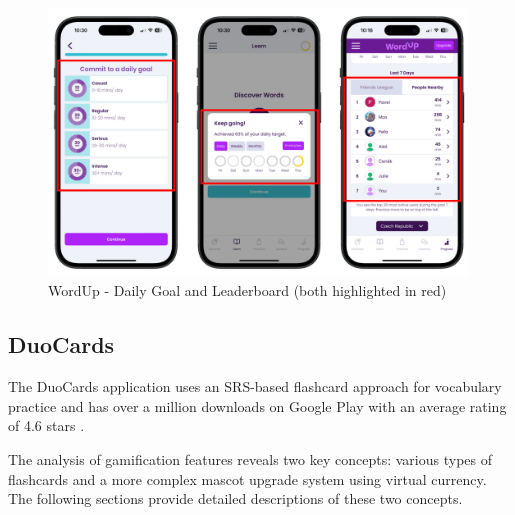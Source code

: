 \begin{itemize}
    \begin{figure}[!h]
        \includegraphics[width=0.99\textwidth]{src/figures/wordup-daily-goal.png}
        \caption{WordUp - Daily Goal and Leaderboard (both highlighted in red)}
        \label{fig:wordup-daily-goal}
    \end{figure}

\end{itemize}

\subsection{DuoCards}

The DuoCards application uses an SRS-based flashcard approach for vocabulary practice and has over a million downloads on Google Play with an average rating of 4.6 stars \cite{cite:duocards_google_play}. 

The analysis of gamification features reveals two key concepts: various types of flashcards and a more complex mascot upgrade system using virtual currency. The following sections provide detailed descriptions of these two concepts.

